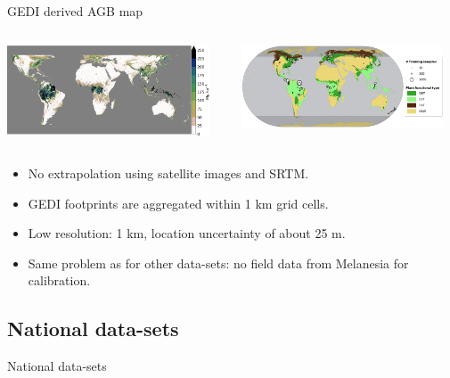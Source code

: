 \documentclass[10pt,table,dvipsnames,compress]{beamer}
\begin{document}
\begin{frame}[label={sec:org9edc783}]{GEDI derived AGB map}
\begin{columns}
\begin{column}{0.5\columnwidth}
\begin{center}
\includegraphics[width=6cm]{figs/carbon/AGB_GEDI.png}
\end{center}
\end{column}

\begin{column}{0.5\columnwidth}
\begin{center}
\includegraphics[width=6cm]{figs/carbon/training-data-GEDI.png}
\end{center}
\end{column}
\end{columns}

\begin{block}{}
\begin{itemize}
\item No extrapolation using satellite images and SRTM.
\item GEDI footprints are aggregated within 1 km grid cells.
\item Low resolution: 1 km, location uncertainty of about 25 m.
\item Same problem as for other data-sets: no field data from Melanesia for calibration.
\end{itemize}
\end{block}
\end{frame}

\subsection{National data-sets}
\label{sec:org733fb7a}

\begin{frame}[label={sec:orgc57e625}]{National data-sets}
\end{frame}
\end{document}
